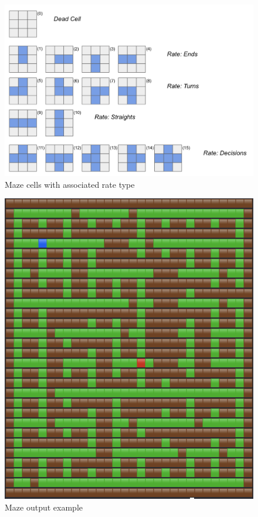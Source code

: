\documentclass[review]{elsarticle}
\begin{document}
\begin{figure}
	\includegraphics[width=\linewidth]{maze_cells_clean.png}
	\caption{Maze cells with associated rate type}
	\label{fig:cells}
\end{figure}

\begin{figure}
	\includegraphics[width=\linewidth]{pretty_output.png}
	\caption{Maze output example}
	\label{fig:pretty_output}
\end{figure}
\end{document}

